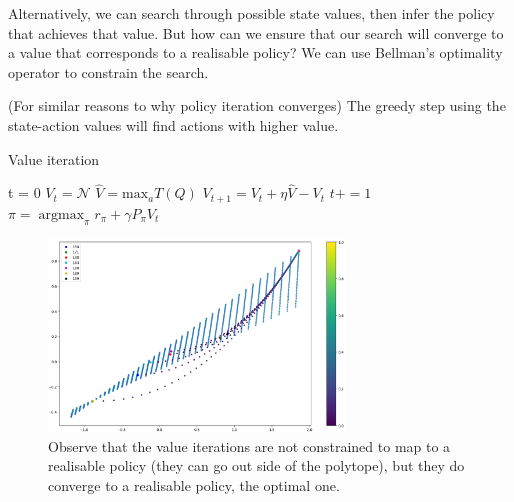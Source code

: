Alternatively, we can search through possible state values, then infer the policy that achieves that value.
But how can we ensure that our search will converge to a value that corresponds to a realisable policy? We can use Bellman's
optimality operator to constrain the search.

(For similar reasons to why policy iteration converges) The greedy step using the
state-action values will find actions with higher value.

\begin{algorithm}[H]
\caption{Value iteration}
\begin{algorithmic}[1]

  \State t = 0
  \State $V_t = \mathcal N$ 
    \State $\hat V = \text{max}_a T(Q)$  
    \State $V_{t+1} = V_t + \eta \hat V - V_t$ 
    \State $t += 1$
  \EndWhile
  \State $\pi = \mathop{\text{argmax}}_{\pi} r_{\pi} + \gamma P_{\pi}V_t$
  \State \algorithmicreturn{ $\pi$}
\EndProcedure

\end{algorithmic}
\end{algorithm}




\begin{figure}[h!]
\centering
\includegraphics[width=0.7\textwidth,height=0.35\textheight]{../../pictures/figures/vi-polytope.png}
\caption{Observe that the value iterations are not constrained to map to a realisable policy
(they can go out side of the polytope), but they do converge to a realisable policy,
the optimal one.}
\end{figure}


